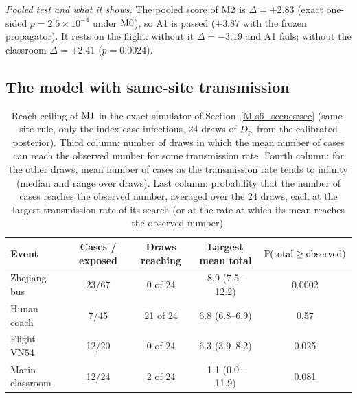 \emph{Pooled test and what it shows.} The pooled score of $\mathrm{M2}$ is $\Delta=+2.83$ (exact one-sided
$p=2.5\times10^{-4}$ under $\mathrm{M0}$), so A1 is passed ($+3.87$ with the frozen propagator). It rests on the flight:
without it $\Delta=-3.19$ and A1 fails; without the classroom $\Delta=+2.41$ ($p=0.0024$).

\subsection{The model with same-site transmission}\label{s8_outbreaks:sec:m1}

\begin{table}[tbp]
  \centering\small
  \caption{Reach ceiling of $\mathrm{M1}$ in the exact simulator of Section~\ref{M-s6_scenes:sec} (same-site rule,
  only the index case infectious, 24 draws of $D_{\mathrm{p}}$ from the calibrated posterior). Third column: number of
  draws in which the mean number of cases can reach the observed number for some transmission rate. Fourth
  column: for the other draws, mean number of cases as the transmission rate tends to infinity (median and
  range over draws). Last column: probability that the number of cases reaches the observed number, averaged
  over the 24 draws, each at the largest transmission rate of its search (or at the rate at which its mean
  reaches the observed number).}
  \label{s8_outbreaks:tab:m1}
  \begin{tabular}{@{}lcccc@{}}
    \toprule
    Event & Cases / exposed & Draws reaching & Largest mean total & $\mathbb{P}(\text{total}\ge\text{observed})$ \\
    \midrule
    Zhejiang bus    & 23/67 & 0 of 24  & 8.9 (7.5--12.2) & 0.0002 \\
    Hunan coach     & 7/45  & 21 of 24 & 6.8 (6.8--6.9)  & 0.57 \\
    Flight VN54     & 12/20 & 0 of 24  & 6.3 (3.9--8.2)  & 0.025 \\
    Marin classroom & 12/24 & 2 of 24  & 1.1 (0.0--11.9) & 0.081 \\
    \bottomrule
  \end{tabular}
\end{table}

